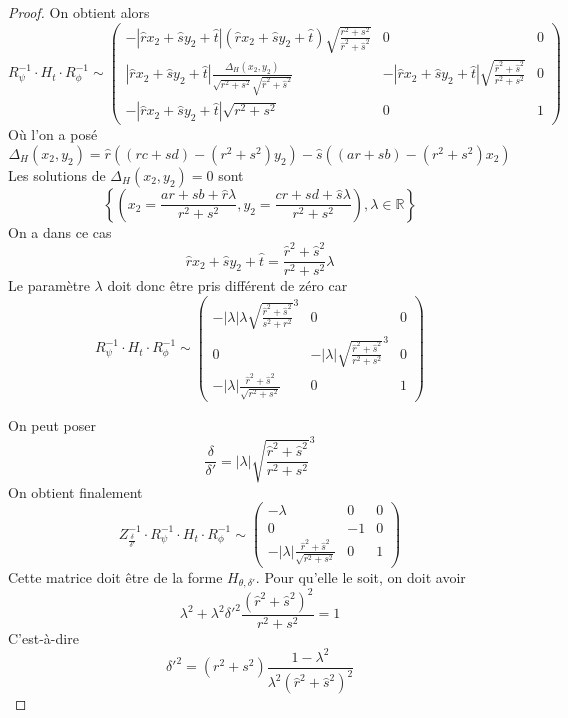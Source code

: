 \begin{proof}
 On obtient alors 
\begin{equation*}
R_{\psi}^{-1} \cdot H_t \cdot R_{\phi}^{-1} \sim 
 \begin{pmatrix}
 -|\hat r x_2 +\hat s y_2 +\hat t|(\hat r x_2 +\hat s y_2 +\hat t)\sqrt{\frac{r^2 + s^2}{\hat r^2 + \hat s^2}}&0&0\\
 |\hat r x_2 +\hat s y_2 +\hat t|\frac{\Delta_H(x_2 , y_2)}{\sqrt{r^2 + s^2}\sqrt{\hat r^2 + \hat s^2}}&-|\hat r x_2 +\hat s y_2 +\hat t|\sqrt{\frac{\hat r^2 + \hat s^2}{r^2 + s^2}}&0\\
 -|\hat r x_2 +\hat s y_2 +\hat t|\sqrt{r^2 + s^2}&0&1
 \end{pmatrix}
\end{equation*}
Où l'on a posé 
\begin{equation*}
\Delta_H(x_2 , y_2 ) =\hat r ((rc+sd)-(r^2 + s^2)y_2) - \hat s ((ar+sb)-(r^2 + s^2 )x_2)
\end{equation*}
Les solutions de $\Delta_H(x_2 , y_2 )=0$ sont
\[ \left\lbrace \left( x_2=\frac{ar+sb+ \hat r \lambda}{r^2 +s^2}, y_2=\frac{cr+sd+\hat s \lambda}{r^2 +s^2}\right), \lambda \in \mathbb R \right\rbrace\]
On a dans ce cas
\begin{equation*}
\hat r x_2 +\hat s y_2 +\hat t = \frac{\hat r^2 +\hat s^2}{r^2 + s^2} \lambda
\end{equation*}
Le paramètre $\lambda$ doit donc être pris différent de zéro car 
\begin{equation*}
R_{\psi}^{-1} \cdot H_t \cdot R_{\phi}^{-1} \sim 
 \begin{pmatrix}
 -| \lambda | \lambda \sqrt{\frac{\hat r^2 + \hat s^2}{s^2 + r^2}}^{3}&0&0\\
0&-| \lambda | \sqrt{\frac{\hat r^2 + \hat s^2}{r^2 + s^2}}^{3}&0\\
 -|\lambda|\frac{\hat r^2 + \hat s^2}{\sqrt{r^2 + s^2}}&0&1
 \end{pmatrix}
\end{equation*}
 
 
 On peut poser 
 \begin{equation*}
 \frac{\delta}{\delta'}=|\lambda|\sqrt{\frac{\hat r^2 + \hat s^2}{r^2 + s^2}}^{3}
 \end{equation*}
On obtient finalement
\begin{equation*}
Z_{\frac{\delta}{\delta'}}^{-1} \cdot R_{\psi}^{-1} \cdot H_t \cdot R_{\phi}^{-1} \sim 
 \begin{pmatrix}
 -\lambda&0&0\\
0&-1&0\\
 -|\lambda|\frac{\hat r^2 + \hat s^2}{\sqrt{r^2 + s^2}}&0&1
 \end{pmatrix}
 \end{equation*}
 Cette matrice doit être de la forme $H_{\theta,\delta'}$. Pour qu'elle le soit, on doit avoir 
 \begin{equation*}
  \lambda^2 + \lambda^2 \delta'^2 \frac{(\hat r^2 + \hat s^2)^2}{r^2 + s^2}=1
 \end{equation*}
 C'est-à-dire
 \begin{equation*}
  \delta'^2 = (r^2 + s^2) \frac{1-\lambda^2}{\lambda^2 (\hat r^2+\hat s^2)^2}
 \end{equation*}
\end{proof}

